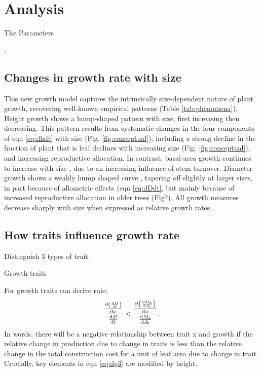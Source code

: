 \documentclass[a4paper,11pt]{article}
\begin{document}
\section{Analysis}

The 
Parameters

\citep{Falster-2016}: \plant

\subsection{Changes in growth rate with size}

This new growth model captures the intrinsically size-dependent nature of plant growth, recovering well-known empirical patterns (Table \ref{tab:phenomena}). Height growth shows a hump-shaped pattern with size, first increasing then decreasing. This pattern results from systematic changes in the four components of eqn \ref{eq:dhdt} with size (Fig. \ref{fig:conceptual}), including a strong decline in the fraction of plant that is leaf declines with increasing size (Fig. \ref{fig:conceptual}), and increasing reproductive allocation. In contrast, basal-area growth continues to increase with size \citep{Sillett-2010, Stephenson-2014}, due to an increasing influence of stem turnover. Diameter growth shows a weakly hump shaped curve \citep{Herault-2011}, tapering off slightly at larger sizes, in part because of allometric effects (eqn \ref{eq:dDdt}, but mainly because of increased reproductive allocation in older trees (Fig?). All growth measures decrease sharply with size when expressed as relative growth rates \citep{Iida-2014}.

\subsection{How traits influence growth rate}

Distinguish 3 types of trait.

Growth traits

For growth traits can derive rule:
\begin{equation}\label{eq:dg4}
\frac{\frac{\partial \left( \frac{ {\rm d}B} {{\rm d}t}\right)}{\partial x}} {\frac{ {\rm d}B} {{\rm d}t}} < \frac{ \frac{\partial \left(\frac{{\rm d}M_{\rm a}} {{\rm d}A_{\rm l}}\right)}{\partial x}}{\frac{{\rm d}M_{\rm a}} {{\rm d}A_{\rm l}}}.
\end{equation}
In words, there will be a negative relationship between trait x and growth if the relative change in production due to change in traits is less than the relative change in the total construction cost for a unit of leaf area due to change in trait. Crucially, key elements in eqn \ref{eq:dg3} are modified by height.
\end{document}

